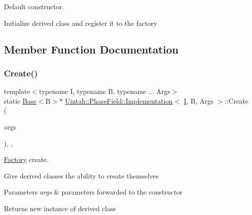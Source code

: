 Default constructor. 

Initialize derived class and register it to the factory 

\subsection{Member Function Documentation}
\mbox{\label{classUintah_1_1PhaseField_1_1Implementation_a411e1f5a60175c99fee000c0486e956c}} 
\subsubsection{\texorpdfstring{Create()}{Create()}}
{\footnotesize\ttfamily template$<$typename I, typename B, typename ... Args$>$ \\
static \hyperlink{classUintah_1_1PhaseField_1_1Base}{Base}$<$B$>$$\ast$ \hyperlink{classUintah_1_1PhaseField_1_1Implementation}{Uintah\+::\+Phase\+Field\+::\+Implementation}$<$ \hyperlink{structUintah_1_1PhaseField_1_1I}{I}, B, Args $>$\+::Create (\begin{DoxyParamCaption}\item[{Args ...}]{args }\end{DoxyParamCaption})\hspace{0.3cm}{\ttfamily [inline]}, {\ttfamily [static]}, {\ttfamily [protected]}}



\hyperlink{classUintah_1_1PhaseField_1_1Factory}{Factory} create. 

Give derived classes the ability to create themselves


\begin{DoxyParams}{Parameters}
{\em args} & parameters forwarded to the constructor \\
\hline
\end{DoxyParams}
\begin{DoxyReturn}{Returns}
new instance of derived class 
\end{DoxyReturn}
\mbox{\label{classUintah_1_1PhaseField_1_1Implementation_a115940ce50afb4e7a2a0a831a2a6577c}} 
